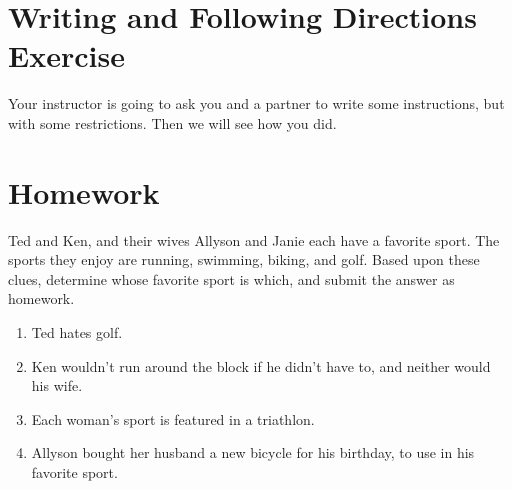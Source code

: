 \section{Writing and Following Directions Exercise}

Your instructor is going to ask you and a partner to write some instructions, but with some restrictions.  Then we will see how you did.

\section{Homework}

Ted and Ken, and their wives Allyson and Janie each have a favorite sport.  The sports they enjoy are running, swimming, biking, and golf.  Based upon these clues, determine whose favorite sport is which, and submit the answer as homework.
\begin{enumerate}
\item Ted hates golf.
\item Ken wouldn't run around the block if he didn't have to, and neither would his wife.
\item Each woman's sport is featured in a triathlon.
\item Allyson bought her husband a new bicycle for his birthday, to use in his favorite sport.
\end{enumerate}
